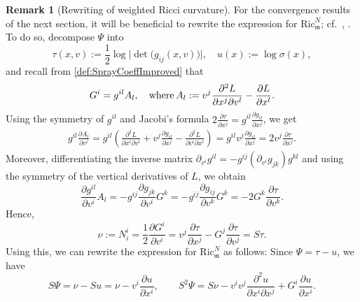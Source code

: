 \documentclass[a4paper,11pt]{article}
\numberwithin{equation}{section}
\theoremstyle{definition}
\newtheorem{Remark}[Definition]{Remark}
\theoremstyle{plain}
\newcommand{\Ric}{\mathrm{Ric}}
\newcommand{\m}{\mathfrak m}
\begin{document}
\begin{Remark}[Rewriting of weighted Ricci curvature]
\label{rmk:WeightedRicciSimplified}
    For the convergence results of the next section, it will be beneficial to rewrite the expression for $\Ric_{\m}^N$; cf.\ \cite[Sec.\ 7]{ShenSCurvature}, \cite[Lem.\ 10.6]{Ohta2021}.
    To do so, decompose $\Psi$ into
    \begin{equation*}
        \tau(x,v) := \frac{1}{2} \log \bigl|\det \bigl(g_{ij}(x,v)\bigr)\bigr|, \quad
        u(x):= \log \sigma(x),
    \end{equation*}
    and recall from \eqref{def:SprayCoeffImproved} that
    \begin{equation*}
        G^i = g^{il} A_l, \quad \textnormal{where} \, A_l := v^j \frac{\partial^2 L}{\partial x^j \partial v^l} - \frac{\partial L}{\partial x^l}.
    \end{equation*}
    Using the symmetry of $g^{il}$ and Jacobi's formula $2 \frac{\partial \tau}{\partial x^j} = g^{il}\frac{\partial g_{il}}{\partial x^j}$, we get
    \begin{align*}
        g^{il}\frac{\partial A_l}{\partial v^i} 
        = g^{il}\left(\frac{\partial^2L}{\partial x^i\partial v^l} +v^j\frac{\partial g_{il}}{\partial x^j} -\frac{\partial^2L}{\partial v^i \partial x^l} \right)
        = g^{il}v^j\frac{\partial g_{il}}{\partial x^j} = 2v^j\frac{\partial\tau}{\partial x^j}.
    \end{align*}
    Moreover, differentiating the inverse
    matrix $\partial_{v^i} g^{il} = - g^{ij} (\partial_{v^i}g_{jk})g^{kl}$ and using the symmetry of the vertical derivatives of
    $L$, we obtain
    \begin{equation*}
        \frac{\partial g^{il}}{\partial v^i}A_l = -g^{ij}\frac{\partial g_{jk}}{\partial v^i}G^k = -g^{ij}\frac{\partial g_{ij}}{\partial v^k}G^k = -2G^k\frac{\partial\tau}{\partial v^k}.
    \end{equation*}
    Hence,
    \begin{equation*}
        \nu :=N^i_i = \frac{1}{2} \frac{\partial G^i}{\partial v^i}= v^j\frac{\partial\tau}{\partial x^j}
        -G^j\frac{\partial\tau}{\partial v^j} = S\tau.
    \end{equation*}
    Using this, we can rewrite the expression for $\Ric_{\m}^N$ as follows:
    Since $\Psi = \tau - u$, we have
    \begin{equation*}
        S\Psi = \nu - Su = \nu - v^i \frac{\partial u}{\partial x^i}, \qquad S^2\Psi = S\nu -  v^iv^j \frac{\partial^2 u}{\partial x^i \partial x^j} + G^i \frac{\partial u}{\partial x^i}.

\end{equation*}
\end{Remark}
\end{document}
